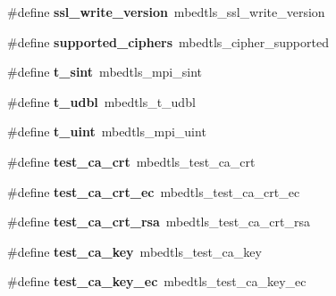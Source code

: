 \begin{DoxyCompactItemize}
\mbox{\label{compat-1_83_8h_a2d61b3263438f4a3b724e27cb3c7eb76}} 
\#define {\bfseries ssl\+\_\+write\+\_\+version}~mbedtls\+\_\+ssl\+\_\+write\+\_\+version
\item 
\mbox{\label{compat-1_83_8h_a13c61599256630b64d6930611782e299}} 
\#define {\bfseries supported\+\_\+ciphers}~mbedtls\+\_\+cipher\+\_\+supported
\item 
\mbox{\label{compat-1_83_8h_ab907e059e683d5f0bad2af7fab6508f0}} 
\#define {\bfseries t\+\_\+sint}~mbedtls\+\_\+mpi\+\_\+sint
\item 
\mbox{\label{compat-1_83_8h_a6984ea062ca0673c6c96f83576f6c30f}} 
\#define {\bfseries t\+\_\+udbl}~mbedtls\+\_\+t\+\_\+udbl
\item 
\mbox{\label{compat-1_83_8h_a1eb390768417258ca1b8b9d2d69de7ea}} 
\#define {\bfseries t\+\_\+uint}~mbedtls\+\_\+mpi\+\_\+uint
\item 
\mbox{\label{compat-1_83_8h_a526bdbdc7e473f1bd0b5558817f3af60}} 
\#define {\bfseries test\+\_\+ca\+\_\+crt}~mbedtls\+\_\+test\+\_\+ca\+\_\+crt
\item 
\mbox{\label{compat-1_83_8h_ae68bb0394e7eccba3190a77f6da98b0a}} 
\#define {\bfseries test\+\_\+ca\+\_\+crt\+\_\+ec}~mbedtls\+\_\+test\+\_\+ca\+\_\+crt\+\_\+ec
\item 
\mbox{\label{compat-1_83_8h_ae557fa875b1a656ac081d7a7dd8fa1cf}} 
\#define {\bfseries test\+\_\+ca\+\_\+crt\+\_\+rsa}~mbedtls\+\_\+test\+\_\+ca\+\_\+crt\+\_\+rsa
\item 
\mbox{\label{compat-1_83_8h_aca9722e2066b367a60fe9efa93a0abae}} 
\#define {\bfseries test\+\_\+ca\+\_\+key}~mbedtls\+\_\+test\+\_\+ca\+\_\+key
\item 
\mbox{\label{compat-1_83_8h_a02455aad5ddd464087a43deffc16b0a4}} 
\#define {\bfseries test\+\_\+ca\+\_\+key\+\_\+ec}~mbedtls\+\_\+test\+\_\+ca\+\_\+key\+\_\+ec
\item 
\mbox{\label{compat-1_83_8h_a8a5dff5371e0f7ed1b2925917a888d0a}} 

\end{DoxyCompactItemize}
